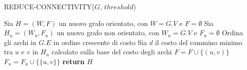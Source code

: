 \begin{algorithm}[H] 
    \caption{REDUCE-CONNECTIVITY($G$, $threshold$)}\label{alg:reduce-connectivity}
    \begin{algorithmic}[1]
        \State Sia $H = (W, F)$ un nuovo grafo orientato, con $W = G.V$ e $F = \emptyset$
        \State Sia $H_u = (W_u, F_u)$ un nuovo grafo non orientato, con $W_u = G.V$ e $F_u = \emptyset$
        \State Ordina gli archi in $G.E$ in ordine crescente di costo
            \State Sia $d$ il costo del cammino minimo tra $u$ e $v$ in $H_u$ calcolato sulla base del costo degli archi
                \State $F = F \cup \{(u, v)\}$
                \State $F_u = F_u \cup \{\{u, v\}\}$ 
            \EndIf
        \EndFor
        \State \textbf{return} $H$
    \end{algorithmic}
\end{algorithm}